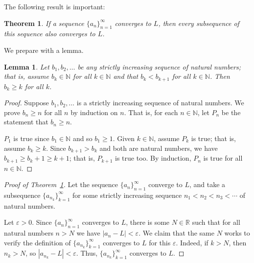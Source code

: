 \documentclass[12pt]{amsart}
\def\e{\varepsilon}
\newcommand{\R}{{\mathbb{R}}}
\newcommand{\N}{\mathbb{N}}
\numberwithin{equation}{section}
\theoremstyle{plain} %
\newtheorem{thm}[equation]{Theorem}
\newtheorem{lem}[equation]{Lemma}
\theoremstyle{definition}
\theoremstyle{remark}
\begin{document}
The following result is important:



\begin{thm}\label{thm:ssq} If a sequence $\{a_n\}_{n=1}^\infty$ converges to $L$, then every subsequence of this sequence also converges to $L$.
\end{thm}

We prepare with a lemma.


\begin{lem} \label{lem211}
	Let $b_1, b_2, \dots$ be any strictly increasing sequence of natural numbers; that is, assume $b_k \in \N$ for all $k \in \N$ and that $b_k < b_{k+1}$ for 
	all $k \in \N$. Then $b_k \geq k$ for all $k$.
\end{lem}

\begin{proof} Suppose $b_1, b_2, \dots$ is a strictly increasing
	sequence of natural numbers. We prove $b_n \geq n$ for all $n$ by
	induction on $n$. 
	That is, for each $n  \in \N$, let $P_n$ be
	the statement that $b_n \geq n$. 
	
	$P_1$ is true since $b_1 \in \N$ and so $b_1 \geq 1$. Given $k \in \N$, assume $P_k$ is true; that is, assume $b_k \geq k$. Since $b_{k+1} >
	b_k$ and both are natural numbers, we have $b_{k+1} \geq b_k + 1 \geq k+1$; that is, $P_{k+1}$ is true too. By induction, $P_n$ is true for all $n \in \N$. 
\end{proof}

\begin{proof}[Proof of Theorem~\ref{thm:ssq}] Let the sequence $\{a_n\}_{n=1}^\infty$ converge to $L$, and take a subsequence $\{a_{n_k}\}_{k=1}^\infty$ for some strictly increasing sequence $n_1 < n_2 < n_3 < \cdots$ of natural numbers. 

Let $\e>0$. Since $\{a_n\}_{n=1}^\infty$ converges to $L$, there is some $N\in \R$ such that for all natural numbers $n>N$ we have $|a_n - L|<\e$. We claim that the same $N$ works to verify the definition of $\{a_{n_k}\}_{k=1}^\infty$ converges to $L$ for this $\e$. Indeed, if $k>N$, then $n_k > N$, so $|a_{n_k} - L| < \e$. Thus, $\{a_{n_k}\}_{k=1}^\infty$ converges to $L$.
\end{proof}
\end{document}
